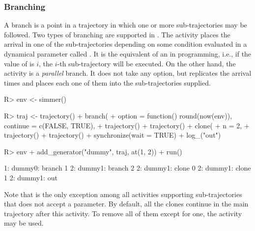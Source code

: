\documentclass[
  nojss]{jss}
\begin{document}
\subsubsection{Branching}\label{branching}

A branch is a point in a trajectory in which one or more
sub-trajectories may be followed. Two types of branching are supported
in . The  activity places the arrival in one
of the sub-trajectories depending on some condition evaluated in a
dynamical parameter called . It is the equivalent of an
 in programming, i.e., if the value of  is
\(i\), the \(i\)-th sub-trajectory will be executed. On the other hand,
the  activity is a \emph{parallel} branch. It does not
take any option, but replicates the arrival  times and places
each one of them into the  sub-trajectories supplied.

\begin{CodeChunk}
\begin{CodeInput}
R> env <- simmer()
\end{CodeInput}
\end{CodeChunk}

\begin{CodeChunk}
\begin{CodeInput}
R> traj <- trajectory() %
+   branch(
+     option = function() round(now(env)), continue = c(FALSE, TRUE),
+     trajectory() %
+     trajectory() %
+   clone(
+     n = 2,
+     trajectory() %
+     trajectory() %
+   synchronize(wait = TRUE) %
+   log_("out")
\end{CodeInput}
\end{CodeChunk}

\begin{CodeChunk}
\begin{CodeInput}
R> env %
+   add_generator("dummy", traj, at(1, 2)) %
+   run() %
\end{CodeInput}
\begin{CodeOutput}
1: dummy0: branch 1
2: dummy1: branch 2
2: dummy1: clone 0
2: dummy1: clone 1
2: dummy1: out
\end{CodeOutput}
\end{CodeChunk}

Note that  is the only exception among all activities
supporting sub-trajectories that does not accept a 
parameter. By default, all the clones continue in the main trajectory
after this activity. To remove all of them except for one, the
 activity may be used.
\end{document}
